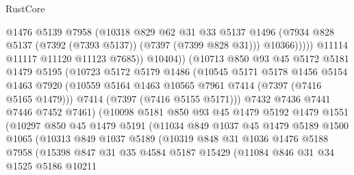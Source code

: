 \begin{lexlean}{RustCore}
\begin{coremodule}
                            @1476
                            @5139
                            @7958
                            (@10318
                              @829
                              @62
                              @31
                              @33
                              @5137
                              @1496
                              (@7934 @828 @5137 (@7392 (@7393 @5137)) (@7397 (@7399 @828 @31)))
                              @10366)))))
                    @11114
                    @11117
                    @11120
                    @11123
                    @7685))
                @10404))
            (@10713
              @850
              @93
              @45
              @5172
              @5181
              @1479
              @5195
              (@10723
                @5172
                @5179
                @1486
                (@10545
                  @5171
                  @5178
                  @1456
                  @5154
                  @1463
                  @7920
                  (@10559 @5164 @1463 @10565 @7961 @7414 (@7397 (@7416 @5165 @1479)))
                  @7414
                  (@7397 (@7416 @5155 @5171)))
                @7432
                @7436
                @7441
                @7446
                @7452
                @7461)
              (@10098
                @5181
                @850
                @93
                @45
                @1479
                @5192
                @1479
                @1551
                (@10297
                  @850
                  @45
                  @1479
                  @5191
                  (@11034
                    @849
                    @1037
                    @45
                    @1479
                    @5189
                    @1500
                    @1065
                    (@10313
                      @849
                      @1037
                      @5189
                      (@10319
                        @848
                        @31
                        @1036
                        @1476
                        @5188
                        @7958
                        (@15398
                          @847
                          @31
                          @35
                          @4584
                          @5187
                          @15429
                          (@11084
                            @846
                            @31
                            @34
                            @1525
                            @5186
                            @10211

\end{coremodule}
\end{lexlean}
